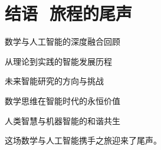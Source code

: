 \chapter*{ 结语\,\, 旅程的尾声}
 \begin{introduction}
  \item 数学与人工智能的深度融合回顾
  \item 从理论到实践的智能发展历程
  \item 未来智能研究的方向与挑战
  \item 数学思维在智能时代的永恒价值
  \item 人类智慧与机器智能的和谐共生


\end{introduction}
这场数学与人工智能携手之旅迎来了尾声。
%
%

